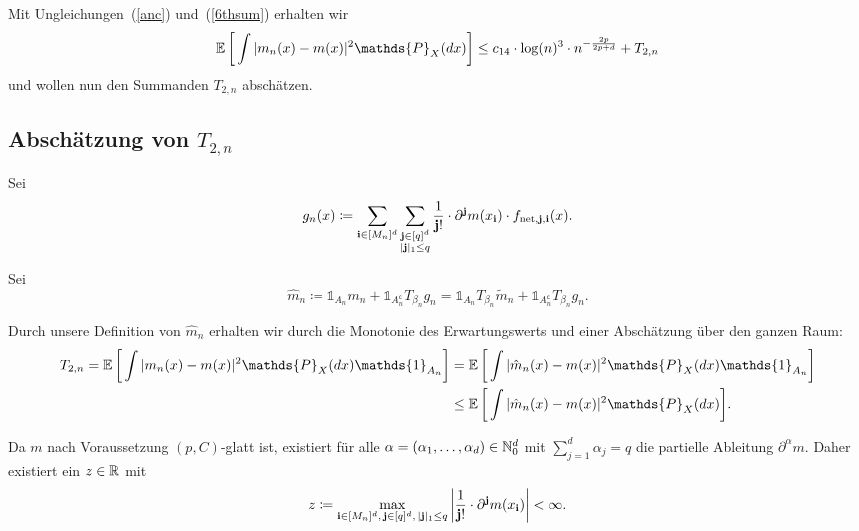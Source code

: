 {Mit Ungleichungen~(\ref{anc}) und~(\ref{6thsum}) erhalten wir
\begin{equation}
\E \bigg[\int |m_n(x) - m(x)|^2 \mathds{P}_X(dx)\bigg] \leq c_{14} \cdot \log(n)^3 \cdot n^{- \frac{2p}{2p + d}} + T_{2,n}
\end{equation}
und wollen nun den Summanden $T_{2,n}$ abschätzen.

\subsection{Abschätzung von $T_{2,n}$}

Sei 
$$g_n(x) \coloneqq \sum_{\mathbf{i} \in [M_n]^d} \sum_{\substack{ \mathbf{j} \in [q]^d \\ |\mathbf{j}|_1 \leq q}} \frac{1}{\mathbf{j}!} \cdot \partial^{\mathbf{j}}m(x_{\mathbf{i}}) \cdot f_{\mathrm{net},\mathbf{j},\mathbf{i}}(x).$$

Sei $$\hat{m}_n \coloneqq \mathds{1}_{A_n}m_n + \mathds{1}_{A_n^{\mathsf{c}}}T_{\beta_n}g_n = \mathds{1}_{A_n}T_{\beta_n}\tilde{m}_n + \mathds{1}_{A_n^{\mathsf{c}}}T_{\beta_n}g_n.$$

Durch unsere Definition von $\hat{m}_n$ erhalten wir durch die Monotonie des Erwartungswerts und einer Abschätzung über den ganzen Raum:
\begin{equation}
\label{an}
\begin{split}
T_{2,n} = \E \bigg[\int |m_n(x) - m(x)|^2 \mathds{P}_X(dx) \mathds{1}_{A_n}\bigg] & = \E \bigg[\int |\hat{m}_n(x) - m(x)|^2 \mathds{P}_X(dx) \mathds{1}_{A_n}\bigg] \\
& \leq \E \bigg[\int |\hat{m}_n(x) - m(x)|^2 \mathds{P}_X(dx)\bigg].
\end{split}
\end{equation}

Da $m$ nach Voraussetzung $(p,C)$-glatt ist, existiert für alle $\alpha = (\alpha_1,\dots,\alpha_d) \in \mathbb{N}_0^d$ mit $\sum_{j = 1}^d\alpha_j = q$ die partielle Ableitung $\partial^{\alpha}m$. Daher existiert ein $z \in \mathbb{R}$ mit
\begin{equation}
\label{bound}
z \coloneqq \max_{\mathbf{i} \in [M_n]^d,\, \mathbf{j} \in [q]^d,\, |\mathbf{j}|_1 \leq q} \bigg|\frac{1}{\mathbf{j}!} \cdot \partial^{\mathbf{j}}m(x_{\mathbf{i}})\bigg| < \infty.
\end{equation}

}
